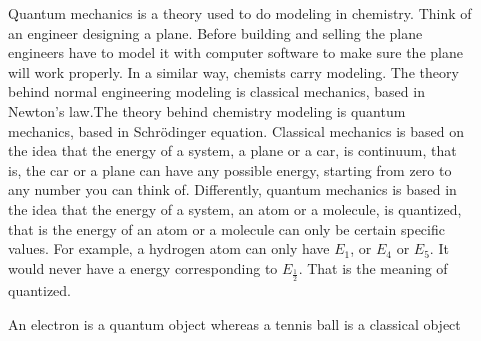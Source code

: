 \documentclass[main.tex]{subfiles}
\begin{document}
\begin{description}
\item[] 
Quantum mechanics is a theory used to do modeling in chemistry. Think of an engineer designing a plane. Before building and selling the plane engineers have to model it with computer software to make sure the plane will work properly. In a similar way, chemists carry modeling. The theory behind normal engineering modeling is classical mechanics, based in Newton's law.The theory behind chemistry modeling is quantum mechanics, based in Schr\"{o}dinger equation. Classical mechanics is based on the idea that the energy of a system, a plane or a car, is continuum, that is, the car or a plane can have any possible energy, starting from zero to any number you can think of. 
Differently, quantum mechanics is based in the idea that the energy of a system, an atom or a molecule, is quantized, that is the energy of an atom or a molecule can only be certain specific values. For example, a hydrogen atom can only have $E_1$, or  $E_4$ or $E_5$. It would never have a energy corresponding to $E_{\frac{1}{2}}$. That is the meaning of quantized.
\begin{marginfigure}
      \caption{An electron is a quantum object whereas a tennis ball is a classical object}
 \end{marginfigure}
 

\end{description}
\end{document}
